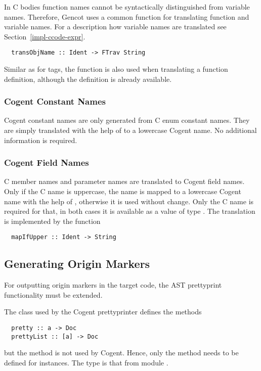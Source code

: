 In C bodies function names cannot be syntactically distinguished from variable names. Therefore, Gencot
uses a common function for translating function and variable names. For a description how variable
names are translated see Section~\ref{impl-ccode-expr}.
\begin{verbatim}
  transObjName :: Ident -> FTrav String
\end{verbatim}

Similar as for tags, the function is also used when translating a function definition, although the 
definition is already available.

\subsubsection{Cogent Constant Names}

Cogent constant names are only generated from C enum constant names. They are simply translated
with the help of  to a lowercase Cogent name. No additional information is required.

\subsubsection{Cogent Field Names}

C member names and parameter names are translated to Cogent field names. Only if the C name is
uppercase, the name is mapped to a lowercase Cogent name with the help of , 
otherwise it is used without change. Only the C name is required for that, in both cases it is
available as a value of type . The translation is implemented by the function
\begin{verbatim}
  mapIfUpper :: Ident -> String
\end{verbatim}

\subsection{Generating Origin Markers}
\label{impl-ccode-origin}

For outputting origin markers in the target code, the AST prettyprint functionality must be extended.

The class  used by the Cogent prettyprinter defines the methods
\begin{verbatim}
  pretty :: a -> Doc
  prettyList :: [a] -> Doc
\end{verbatim}
but the method  is not used by Cogent. Hence, only the method  needs to be defined
for instances. The type  is that from module .

